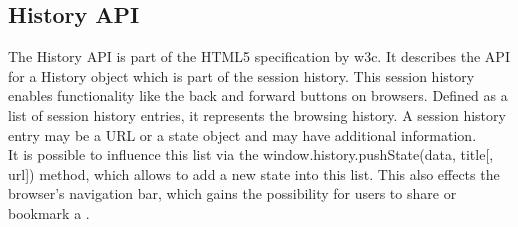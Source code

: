 \subsection{History API}
The History API is part of the HTML5 specification by \gls{w3c}.
It describes the API for a History object which is part of the session history.
This session history enables functionality like the back and forward buttons on browsers.
Defined as a list of session history entries, it represents the browsing history.
A session history entry may be a URL or a state object and may have additional information.
\\
It is possible to influence this list via the window.history.pushState(data, title[, url]) method, which allows to add a new state into this list.
This also effects the browser's navigation bar, which gains the possibility for users to share or bookmark a \webPage{}.
\\